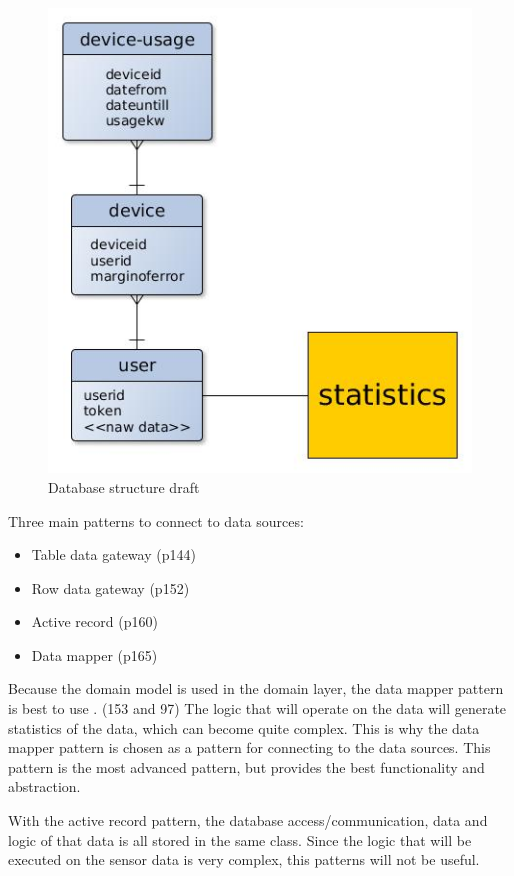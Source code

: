 \begin{figure}[H]
\caption{Database structure draft}
\centering
\includegraphics[]{4-analysis/images/SoftwarePatternsDatabaseDraft.jpg}
\end{figure}

Three main patterns to connect to data sources:

\begin{itemize}
\item Table data gateway (p144)
\item Row data gateway (p152)
\item Active record (p160)
\item Data mapper (p165)
\end{itemize}

Because the domain model is used in the domain layer, the data mapper pattern is best to use . (153 and 97)
The logic that will operate on the data will generate statistics of the data, which can become quite complex. This is why the data mapper pattern is chosen as a pattern for connecting to the data sources. This pattern is the most advanced pattern, but provides the best functionality and abstraction.

With the active record pattern, the database access/communication, data and logic of that data is all stored in the same class. Since the logic that will be executed on the sensor data is very complex, this patterns will not be useful.

